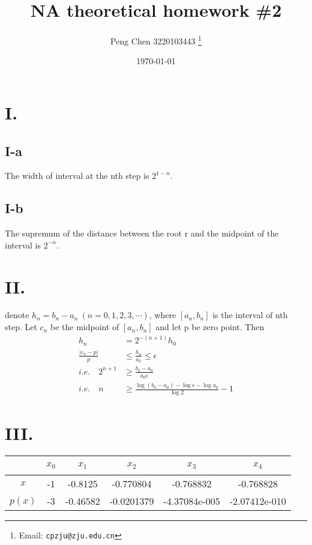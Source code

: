 \documentclass[a4paper]{article}
\begin{document}
\title{NA theoretical homework \#2}

\author{Peng Chen 3220103443
  \thanks{Email: \texttt{cpzju@zju.edu.cn}}}


\date{\today}

\maketitle

\section*{I.}

\subsection*{I-a}
The width of interval at the nth step is $2^{1-n}$.

\subsection*{I-b}
The supremum of the distance between the root r and the midpoint of the interval is $2^{-n}$.


\section*{II.}


denote $h_{n}=b_{n}-a_{n}\ (n=0,1,2,3,\cdots)$, where $[a_{n},b_{n}]$ is the interval of nth step. 
Let $c_n$ be the midpoint of $[a_{n},b_{n}]$ and let p be zero point. Then
$$
\begin{aligned}
  h_{n}&=2^{-(n+1)}h_{0} \\
  \frac{\lvert c_{n}-p \rvert}{p} &\leq \frac{h_{n}}{a_{0}} \leq \epsilon \\
  i.e.\quad 2^{n+1} &\geq \frac{b_{0}-a_{0}}{a_{0}\epsilon} \\
  i.e.\quad n &\geq \frac{\log(b_{0}-a_{0})-\log\epsilon-\log a_{0}}{\log2}-1 
\end{aligned}
$$

\section*{III.}
\begin{table}[!ht]
  \centering
  \begin{tabular}{|c|c|c|c|c|c|}
  \hline
      ~ & $x_{0}$ & $x_{1}$ & $x_{2}$ & $x_{3}$ & $x_{4}$ \\ \hline
      $x$ & -1 & -0.8125 & -0.770804 & -0.768832 & -0.768828 \\ \hline
      $p(x)$ & -3 & -0.46582 & -0.0201379 & -4.37084e-005 & -2.07412e-010 \\ \hline
  \end{tabular}
\end{table}
\end{document}
